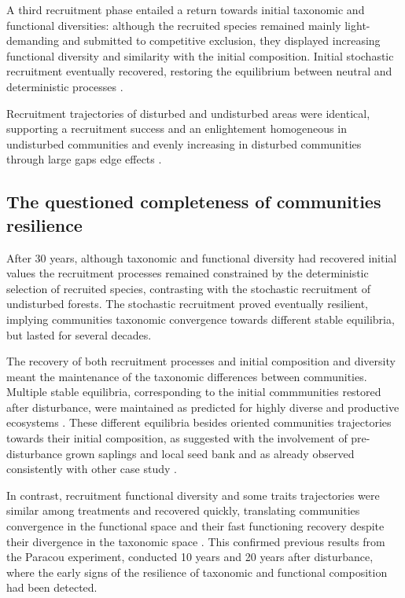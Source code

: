\documentclass[fleqn,10pt]{ArtEcoFoG} %
\begin{document}
A third recruitment phase entailed a return towards initial taxonomic
and functional diversities: although the recruited species remained
mainly light-demanding and submitted to competitive exclusion, they
displayed increasing functional diversity and similarity with the
initial composition. Initial stochastic recruitment eventually
recovered, restoring the equilibrium between neutral and deterministic
processes \citep{Lawton1988, Chave2004, Mayfield2010}.

Recruitment trajectories of disturbed and undisturbed areas were
identical, supporting a recruitment success and an enlightement
homogeneous in undisturbed communities \citep{Dalling2002} and evenly
increasing in disturbed communities through large gaps edge effects
\citep{Ruger2009}.

\subsection{The questioned completeness of communities
resilience}\label{the-questioned-completeness-of-communities-resilience}

After 30 years, although taxonomic and functional diversity had
recovered initial values the recruitment processes remained constrained
by the deterministic selection of recruited species, contrasting with
the stochastic recruitment of undisturbed forests. The stochastic
recruitment proved eventually resilient, implying communities taxonomic
convergence towards different stable equilibria, but lasted for several
decades.

The recovery of both recruitment processes and initial composition and
diversity meant the maintenance of the taxonomic differences between
communities. Multiple stable equilibria, corresponding to the initial
commmunities restored after disturbance, were maintained as predicted
for highly diverse and productive ecosystems \citep{Chase2003}. These
different equilibria besides oriented communities trajectories towards
their initial composition, as suggested with the involvement of
pre-disturbance grown saplings and local seed bank and as already
observed consistently with other case study
\citep{Dalling2002, Anderson2007}.

In contrast, recruitment functional diversity and some traits
trajectories were similar among treatments and recovered quickly,
translating communities convergence in the functional space and their
fast functioning recovery despite their divergence in the taxonomic
space \citep{Fukami2005}. This confirmed previous results from the
Paracou experiment, conducted 10 years \citep{Molino2001} and 20 years
\citep{Baraloto2012a} after disturbance, where the early signs of the
resilience of taxonomic and functional composition had been detected.
\end{document}
